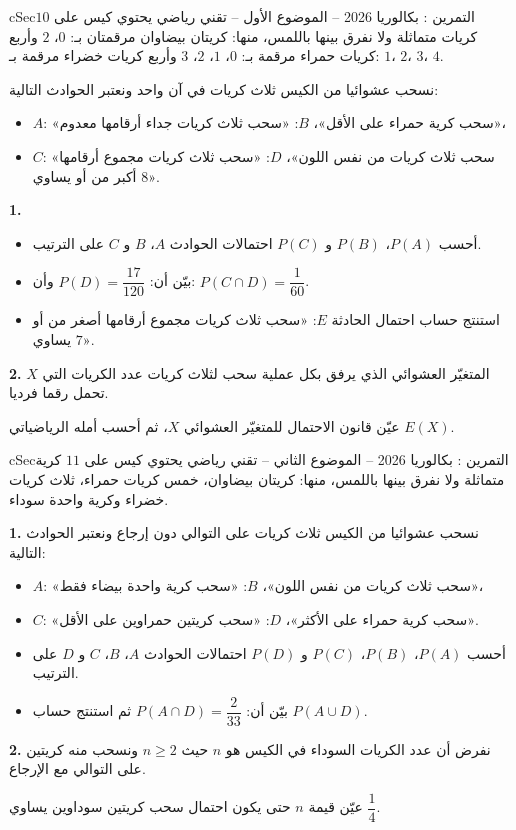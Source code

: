 \documentclass[12pt,a4paper]{article}
\newenvironment{BOX}[2]{\begin{otherlanguage}{english}\begin{arbox}{#1}{#2}}{\end{arbox}\end{otherlanguage}}
\newcounter{exo}
\newenvironment{tamrin}[1]{\stepcounter{exo}\begin{BOX}{cSec}{التمرين \theexo: #1}}{\end{BOX}}
\newenvironment{sq}{\begin{itemize}[leftmargin=2.4em,itemsep=3pt]}{\end{itemize}}
\newcommand{\qa}{\item[(أ)]}\newcommand{\qb}{\item[(ب)]}\newcommand{\qc}{\item[(جـ)]}\newcommand{\qd}{\item[(د)]}\newcommand{\qe}{\item[(هـ)]}
\newcommand{\QQ}[1]{\par\smallskip\textbf{#1.} }
\begin{document}
\begin{tamrin}{بكالوريا 2026 -- الموضوع الأول -- تقني رياضي}
يحتوي كيس على $10$ كريات متماثلة ولا نفرق بينها باللمس، منها: كريتان بيضاوان مرقمتان بـ: $0$، $2$ وأربع كريات حمراء مرقمة بـ: $0$، $1$، $2$، $3$ وأربع كريات خضراء مرقمة بـ: $1$، $2$، $3$، $4$.

نسحب عشوائيا من الكيس ثلاث كريات في آن واحد ونعتبر الحوادث التالية:
\begin{itemize}
\item $A$: «سحب كرية حمراء على الأقل»، \quad $B$: «سحب ثلاث كريات جداء أرقامها معدوم»،
\item $C$: «سحب ثلاث كريات من نفس اللون»، \quad $D$: «سحب ثلاث كريات مجموع أرقامها أكبر من أو يساوي $8$».
\end{itemize}
\QQ{1}
\begin{sq}
\qa أحسب $P(A)$، $P(B)$ و $P(C)$ احتمالات الحوادث $A$، $B$ و $C$ على الترتيب.
\qb بيّن أن: $P(D)=\dfrac{17}{120}$ وأن: $P(C\cap D)=\dfrac{1}{60}$.
\qc استنتج حساب احتمال الحادثة $E$: «سحب ثلاث كريات مجموع أرقامها أصغر من أو يساوي $7$».
\end{sq}
\QQ{2} $X$ المتغيّر العشوائي الذي يرفق بكل عملية سحب لثلاث كريات عدد الكريات التي تحمل رقما فرديا.

عيّن قانون الاحتمال للمتغيّر العشوائي $X$، ثم أحسب أمله الرياضياتي $E(X)$.
\end{tamrin}

\begin{tamrin}{بكالوريا 2026 -- الموضوع الثاني -- تقني رياضي}
يحتوي كيس على $11$ كرية متماثلة ولا نفرق بينها باللمس، منها: كريتان بيضاوان، خمس كريات حمراء، ثلاث كريات خضراء وكرية واحدة سوداء.
\QQ{1} نسحب عشوائيا من الكيس ثلاث كريات على التوالي دون إرجاع ونعتبر الحوادث التالية:
\begin{itemize}
\item $A$: «سحب ثلاث كريات من نفس اللون»، \quad $B$: «سحب كرية واحدة بيضاء فقط»،
\item $C$: «سحب كرية حمراء على الأكثر»، \quad $D$: «سحب كريتين حمراوين على الأقل».
\end{itemize}
\begin{sq}
\qa أحسب $P(A)$، $P(B)$، $P(C)$ و $P(D)$ احتمالات الحوادث $A$، $B$، $C$ و $D$ على الترتيب.
\qb بيّن أن: $P(A\cap D)=\dfrac{2}{33}$ ثم استنتج حساب $P(A\cup D)$.
\end{sq}
\QQ{2} نفرض أن عدد الكريات السوداء في الكيس هو $n$ حيث $n\ge 2$ ونسحب منه كريتين على التوالي مع الإرجاع.

عيّن قيمة $n$ حتى يكون احتمال سحب كريتين سوداوين يساوي $\dfrac{1}{4}$.
\end{tamrin}
\end{document}
